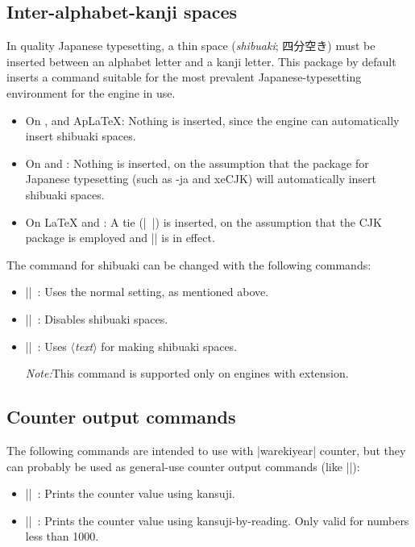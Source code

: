 \documentclass[a4paper]{article}
\newcommand{\Pkg}[1]{\textsf{#1}}
\newcommand{\Meta}[1]{$\langle$\textit{#1}$\rangle$}
\newcommand{\Note}{\par\noindent\emph{Note:}\quad}
\newcommand{\Means}{~:\quad}
\newcommand*{\Ja}[1]{{\fIpaex#1}}
\newcommand*{\+}{\hspace{0.25em minus 0.25em}}
\begin{document}
\subsection{Inter-alphabet-kanji spaces}

In quality Japanese typesetting, a thin space
(\emph{shibuaki}; \Ja{四分空き}) must be inserted
between an alphabet letter and a kanji letter.
This package by default inserts a command
suitable for the most prevalent Japanese-typesetting environment
for the engine in use.

\begin{itemize}
\item On {\pLaTeX}, {\upLaTeX} and {Ap\LaTeX}:
  Nothing is inserted,
  since the engine can automatically insert shibuaki spaces.
\item On {\LuaLaTeX} and {\XeLaTeX}:
  Nothing is inserted,
  on the assumption that the package for Japanese typesetting
  (such as \Pkg{\LuaTeX-ja} and \Pkg{xeCJK})
  will automatically insert shibuaki spaces.
\item On {\LaTeX} and {\pdfLaTeX}:
  A tie (|~|) is inserted,
  on the assumption that the \Pkg{CJK} package is employed
  and |\CJKtilde| is in effect.
\end{itemize}

The command for shibuaki can be changed with the following commands:
\begin{itemize}
\item |\WarekiUseNormalInterGlue|\Means
  Uses the normal setting, as mentioned above.
\item |\WarekiUseNoInterGlue|\Means
  Disables shibuaki spaces.
\item |\WarekiUseCustomInterGlue{|\Meta{text}|}|\Means
  Uses \Meta{text} for making shibuaki spaces.
  \Note This command is supported
  only on engines with {\eTeX} extension.
\end{itemize}

\subsection{Counter output commands}

The following commands are intended
to use with |warekiyear| counter,
but they can probably be used
as general-use counter output commands
(like |\arabic|):
\begin{itemize}
\item |\WarekiKansuji{|\Meta{counter}|}|\Means
  Prints the counter value using kansuji.
\item |\WarekiJKansuji{|\Meta{counter}|}|\Means
  Prints the counter value using kansuji-by-reading.
  Only valid for numbers less than 1000.
\end{itemize}
\end{document}
